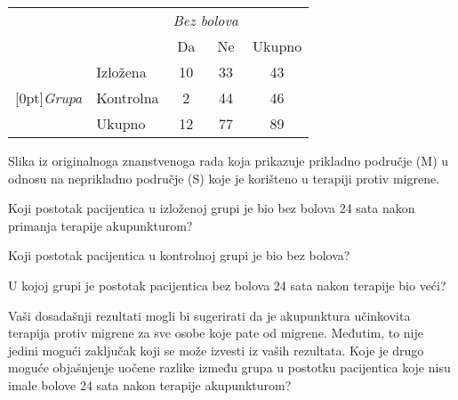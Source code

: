 {\noindent\begin{minipage}[l]{0.4\textwidth}
\begin{tabular}{ll  cc c} 
			                         		&           & \multicolumn{2}{c}{\textit{Bez bolova}} \\
\cline{3-4}
			                        	 	&			& Da 	& Ne 	                  & Ukupno \\
\cline{2-5}
							& Izložena 	& 10	 	& 33		                  & 43 \\
\raisebox{1.5ex}[0pt]{\emph{Grupa}} & Kontrolna	 	& 2	 	& 44 	 	                  & 46 \\
\cline{2-5}
							& Ukupno		& 12		& 77		                  & 89
\end{tabular}
\end{minipage}
\begin{minipage}[c]{0.05\textwidth}
\end{minipage}
\begin{minipage}[c]{0.27\textwidth}
\begin{center}
\end{center}
\end{minipage}
\begin{minipage}[c]{0.25\textwidth}
{\footnotesize Slika iz originalnoga znanstvenoga rada koja prikazuje prikladno područje
(M) u odnosu na neprikladno područje (S) koje je korišteno u terapiji protiv migrene.}
\end{minipage}
\begin{parts}
\item Koji postotak pacijentica u izloženoj grupi je bio bez bolova 24 sata nakon primanja terapije akupunkturom? 
\item Koji postotak pacijentica u kontrolnoj grupi je bio bez bolova?
\item U kojoj grupi je postotak pacijentica bez bolova 24 sata nakon terapije bio veći?
\item Vaši dosadašnji rezultati mogli bi sugerirati da je akupunktura učinkovita terapija
protiv migrene za sve osobe koje pate od migrene. Međutim, to nije jedini mogući zaključak
koji se može izvesti iz vaših rezultata. Koje je drugo moguće objašnjenje uočene razlike između grupa u postotku pacijentica koje nisu imale bolove 24 sata nakon terapije akupunkturom?
\end{parts}
}{}


